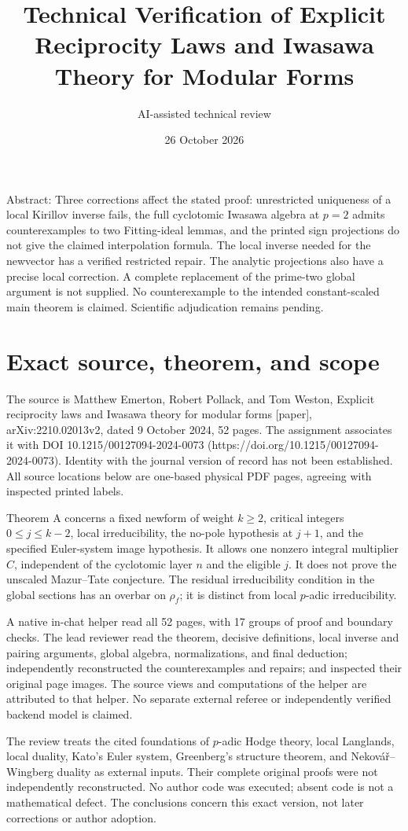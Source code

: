 \documentclass[10pt]{article}
\title{Technical Verification of
Explicit Reciprocity Laws and Iwasawa Theory
for Modular Forms}
\author{AI-assisted technical review}
\date{26 October 2026}
\begin{document}
\maketitle
Abstract: Three corrections affect the stated proof: unrestricted uniqueness of a local Kirillov inverse fails, the full cyclotomic Iwasawa algebra at \(p=2\) admits counterexamples to two Fitting-ideal lemmas, and the printed sign projections do not give the claimed interpolation formula. The local inverse needed for the newvector has a verified restricted repair. The analytic projections also have a precise local correction. A complete replacement of the prime-two global argument is not supplied. No counterexample to the intended constant-scaled main theorem is claimed. Scientific adjudication remains pending.\par
\section*{Exact source, theorem, and scope}
The source is Matthew Emerton, Robert Pollack, and Tom Weston, Explicit reciprocity laws and Iwasawa theory for modular forms [paper], arXiv:2210.02013v2, dated 9 October 2024, 52 pages. The assignment associates it with DOI 10.1215/00127094-2024-0073 (https://doi.org/10.1215/00127094-2024-0073). Identity with the journal version of record has not been established. All source locations below are one-based physical PDF pages, agreeing with inspected printed labels.\par
Theorem A concerns a fixed newform of weight \(k\geq2\), critical integers \(0\leq j\leq k-2\), local irreducibility, the no-pole hypothesis at \(j+1\), and the specified Euler-system image hypothesis. It allows one nonzero integral multiplier \(C\), independent of the cyclotomic layer \(n\) and the eligible \(j\). It does not prove the unscaled Mazur–Tate conjecture. The residual irreducibility condition in the global sections has an overbar on \(\rho_f\); it is distinct from local \(p\)-adic irreducibility.\par
A native in-chat helper read all 52 pages, with 17 groups of proof and boundary checks. The lead reviewer read the theorem, decisive definitions, local inverse and pairing arguments, global algebra, normalizations, and final deduction; independently reconstructed the counterexamples and repairs; and inspected their original page images. The source views and computations of the helper are attributed to that helper. No separate external referee or independently verified backend model is claimed.\par
The review treats the cited foundations of \(p\)-adic Hodge theory, local Langlands, local duality, Kato’s Euler system, Greenberg’s structure theorem, and Nekovář–Wingberg duality as external inputs. Their complete original proofs were not independently reconstructed. No author code was executed; absent code is not a mathematical defect. The conclusions concern this exact version, not later corrections or author adoption.\par
\end{document}
